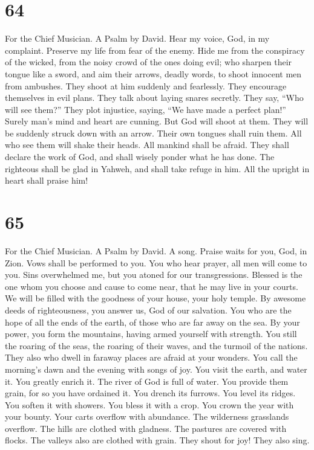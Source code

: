 \hypertarget{section-63}{%
\section{64}\label{section-63}}

For the Chief Musician. A Psalm by David.  Hear my voice,
God, in my complaint. Preserve my life from fear of the enemy.
 Hide me from the conspiracy of the wicked, from the noisy
crowd of the ones doing evil;  who sharpen their tongue
like a sword, and aim their arrows, deadly words,  to
shoot innocent men from ambushes. They shoot at him suddenly and
fearlessly.  They encourage themselves in evil plans. They
talk about laying snares secretly. They say, ``Who will see them?''
 They plot injustice, saying, ``We have made a perfect
plan!'' Surely man's mind and heart are cunning.  But God
will shoot at them. They will be suddenly struck down with an arrow.
 Their own tongues shall ruin them. All who see them will
shake their heads.  All mankind shall be afraid. They
shall declare the work of God, and shall wisely ponder what he has done.
 The righteous shall be glad in Yahweh, and shall take
refuge in him. All the upright in heart shall praise him!

\hypertarget{section-64}{%
\section{65}\label{section-64}}

For the Chief Musician. A Psalm by David. A song.  Praise
waits for you, God, in Zion. Vows shall be performed to you.
 You who hear prayer, all men will come to you.
 Sins overwhelmed me, but you atoned for our
transgressions.  Blessed is the one whom you choose and
cause to come near, that he may live in your courts. We will be filled
with the goodness of your house, your holy temple.  By
awesome deeds of righteousness, you answer us, God of our salvation. You
who are the hope of all the ends of the earth, of those who are far away
on the sea.  By your power, you form the mountains, having
armed yourself with strength.  You still the roaring of
the seas, the roaring of their waves, and the turmoil of the nations.
 They also who dwell in faraway places are afraid at your
wonders. You call the morning's dawn and the evening with songs of joy.
 You visit the earth, and water it. You greatly enrich it.
The river of God is full of water. You provide them grain, for so you
have ordained it.  You drench its furrows. You level its
ridges. You soften it with showers. You bless it with a crop.
 You crown the year with your bounty. Your carts overflow
with abundance.  The wilderness grasslands overflow. The
hills are clothed with gladness.  The pastures are
covered with flocks. The valleys also are clothed with grain. They shout
for joy! They also sing.

